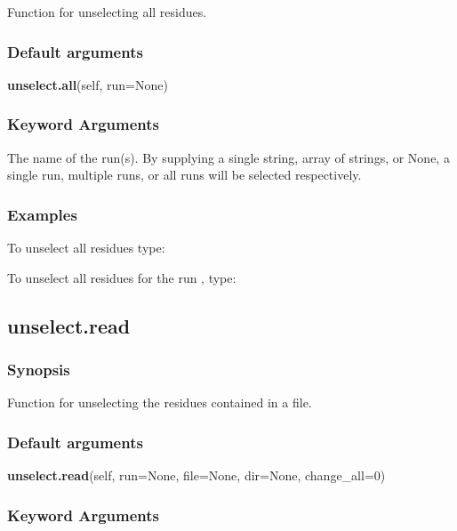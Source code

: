 Function for unselecting all residues.

\subsubsection{Default arguments}

\textsf{\textbf{unselect.all}(self, run=None)}


\subsubsection{Keyword Arguments}

  The name of the run(s).  By supplying a single string, array of strings, or None, a single run, multiple runs, or all runs will be selected respectively.

\subsubsection{Examples}

To unselect all residues type:




To unselect all residues for the run 
, type:





\newpage

\subsection{unselect.read}


\subsubsection{Synopsis}

Function for unselecting the residues contained in a file.

\subsubsection{Default arguments}

\textsf{\textbf{unselect.read}(self, run=None, file=None, dir=None, change\_all=0)}


\subsubsection{Keyword Arguments}

